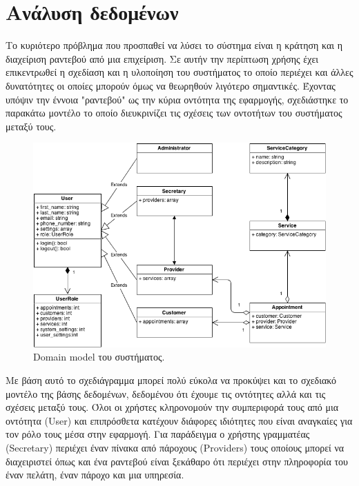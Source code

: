 \section{Ανάλυση δεδομένων}
Το κυριότερο πρόβλημα που προσπαθεί να λύσει το σύστημα είναι η κράτηση και η διαχείριση ραντεβού από μια επιχείριση. Σε αυτήν την περίπτωση χρήσης έχει επικεντρωθεί η σχεδίαση και η υλοποίηση του συστήματος το οποίο περιέχει και άλλες δυνατότητες οι οποίες μπορούν όμως να θεωρηθούν λιγότερο σημαντικές. Έχοντας υπόψιν την έννοια "ραντεβού" ως την κύρια οντότητα της εφαρμογής, σχεδιάστηκε το παρακάτω μοντέλο το οποίο διευκρινίζει τις σχέσεις των οντοτήτων του συστήματος μεταξύ τους.

\begin{figure}[ht!]
\centering
\includegraphics[width=160mm]{images/domain-model.png}
\caption{Domain model του συστήματος.}
\label{domain-model}
\end{figure}

Με βάση αυτό το σχεδιάγραμμα μπορεί πολύ εύκολα να προκύψει και το σχεδιακό μοντέλο της βάσης δεδομένων, δεδομένου ότι έχουμε τις οντότητες αλλά και τις σχέσεις μεταξύ τους. Όλοι οι χρήστες κληρονομούν την συμπεριφορά τους από μια οντότητα (User) και επιπρόσθετα κατέχουν διάφορες ιδιότητες που είναι αναγκαίες για τον ρόλο τους μέσα στην εφαρμογή. Για παράδειγμα ο χρήστης γραμματέας (Secretary) περιέχει έναν πίνακα από πάροχους (Providers) τους οποίους μπορεί να διαχειριστεί όπως και ένα ραντεβού είναι ξεκάθαρο ότι περιέχει στην πληροφορία του έναν πελάτη, έναν πάροχο και μια υπηρεσία.


